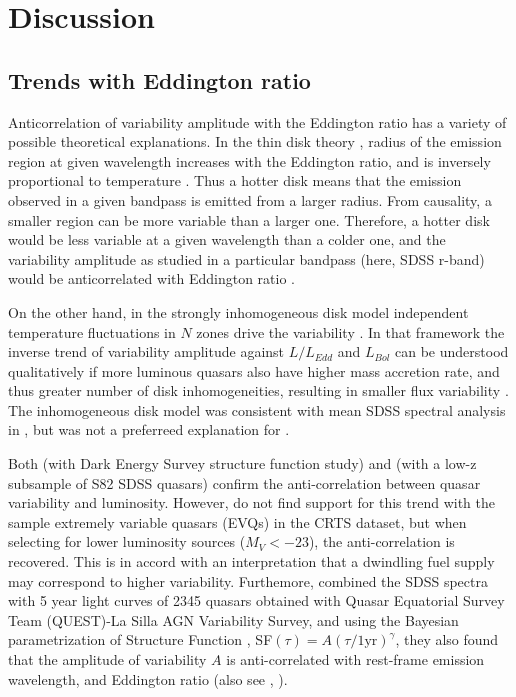 \documentclass[twocolumn]{aastex62}
\begin{document}


%
%
%
%

\section{Discussion}
\label{sec:discussion}
\subsection{Trends with Eddington ratio}
Anticorrelation of  variability amplitude with the Eddington ratio  has a variety of possible theoretical explanations. In the thin disk theory \cite{shakura1973, frank2002, netzer2013}, radius of the emission region at given wavelength increases with the Eddington ratio, and is inversely proportional to temperature \citep{rakshit2017}. Thus a hotter disk means that the emission observed in a given bandpass is emitted from a larger radius. From causality, a smaller region can be more variable than a larger one. Therefore, a  hotter disk would be less variable at a given wavelength than a colder one, and  the variability amplitude as studied in a particular bandpass (here, SDSS r-band) would be anticorrelated with Eddington ratio \citep{fausnaugh2016,edelson2015}. 

On the other hand, in the strongly inhomogeneous disk model independent temperature fluctuations in $N$ zones drive the variability \citep{dexter2011} . In that framework the inverse trend of variability amplitude against $L/L_{Edd}$  and $L_{Bol}$  can be understood qualitatively if more luminous quasars also have higher mass accretion rate, and thus greater number of disk inhomogeneities, resulting in smaller flux variability \citep{simm2016}. The inhomogeneous disk model was consistent with mean SDSS spectral analysis in \citet{ruan2014}, but was not a preferreed explanation for \citet{kokubo2015}. 

Both \citet{rumbaugh2018} (with Dark Energy Survey structure function study) and  \citet{sun2018}  (with a low-z subsample of S82 SDSS quasars) confirm the anti-correlation between quasar variability and luminosity. However, \citet{graham2019} do not find support for this trend with the sample extremely variable quasars (EVQs) in the CRTS dataset,  but when selecting for lower luminosity sources ($M_{V} < -23$), the anti-correlation is recovered. This is in accord with an interpretation that a dwindling fuel supply may correspond to higher variability. Furthemore, \citet{sanchez2018} combined the SDSS spectra with 5 year light curves of 2345 quasars obtained with Quasar Equatorial Survey Team (QUEST)-La Silla AGN Variability Survey, and  using the Bayesian parametrization of Structure Function \citep{schmidt2010},  SF$(\tau) = A(\tau/1 \mathrm{yr})^{\gamma} $, they also found that the amplitude of variability $A$ is anti-correlated with rest-frame emission wavelength,  and Eddington ratio (also see \citealt{simm2016}, \citealt{rakshit2017}).
\end{document}

